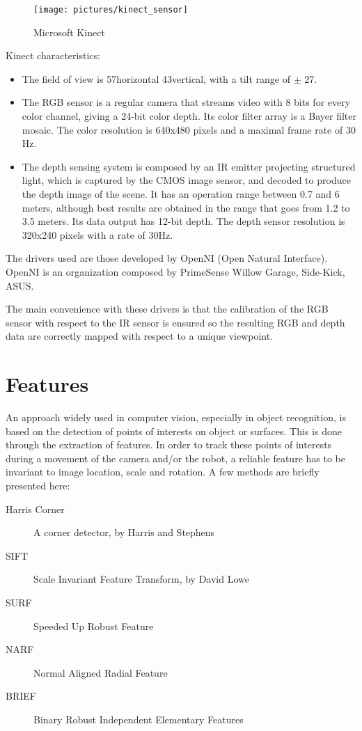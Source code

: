 \begin{figure}[h!]
\centering
\texttt{[image: pictures/kinect\_sensor]}
\caption{Microsoft Kinect}
\end{figure}

Kinect characteristics:
\begin{itemize}
\item The field of view is 57\textdegree horizontal 43\textdegree vertical, with a tilt range of $\pm$ 27\textdegree.
\item The RGB sensor is a regular camera that streams video with 8 bits for every color channel, giving a 24-bit color depth. Its color filter array is a Bayer filter mosaic. The color resolution is 640x480 pixels and a maximal frame rate of 30 Hz.
\item The depth sensing system is composed by an IR emitter projecting structured light, which is captured by the CMOS image sensor, and decoded to produce the depth image of the scene. It has an operation range between 0.7 and 6 meters, although best results are obtained in the range that goes from 1.2 to 3.5 meters. Its data output has 12-bit depth. The depth sensor resolution is 320x240 pixels with a rate of 30Hz.
\end{itemize}

The drivers used are those developed by OpenNI (Open Natural Interface). OpenNI is an organization composed by PrimeSense Willow Garage, Side-Kick, ASUS.

The main convenience with these drivers is that the calibration of the RGB sensor with respect to the IR sensor is ensured so the resulting RGB and depth data are correctly mapped with respect to a unique viewpoint.


\section{Features}

An approach widely used in computer vision, especially in object recognition, is based on the detection of points of interests on object or surfaces. This is done through the extraction of features. In order to track these points of interests during a movement of the camera and/or the robot, a reliable feature has to be invariant to image location, scale and rotation. A few methods are briefly presented here:

\begin{description}
\item[Harris Corner] A corner detector, by Harris and Stephens~\cite{Harris88alvey}
\item[SIFT] Scale Invariant Feature Transform, by David Lowe~\cite{lowe_2004_sift} 
\item[SURF] Speeded Up Robust Feature~\cite{surf}
\item[NARF] Normal Aligned Radial Feature~\cite{steder10irosws}
\item[BRIEF] Binary Robust Independent Elementary Features~\cite{Calonder10-brief}
\end{description}

